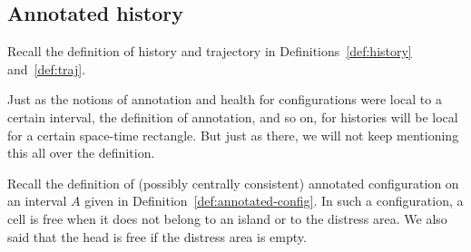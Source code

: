 \documentclass[12pt]{memoir}
\begin{document}
\subsection{Annotated history}

Recall the definition of history and trajectory in Definitions~\ref{def:history} 
and~\ref{def:traj}.

Just as the notions of annotation and health for configurations were local to a certain
interval, the definition of annotation, and so on, for histories 
will be local for a certain space-time rectangle.
But just as there, we will not keep mentioning this all over the definition.

Recall the definition of (possibly centrally consistent)
annotated configuration on an interval \( A \) given
in Definition~\ref{def:annotated-config}.
In such a configuration, a cell is free when it does not
belong to an island or to the distress area.
We also said that the head is free if the distress area is empty.
\end{document}
